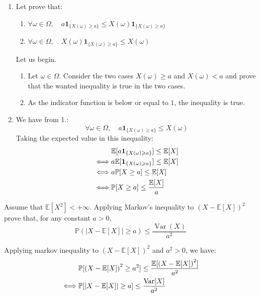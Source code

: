 \begin{solution}
  \begin{enumerate}
    \item Let prove that:
          \begin{enumerate}
            \item $\forall \omega \in \Omega, \quad a \mathbf{1}_{\{X(\omega) \geqslant a\}} \leqslant X(\omega) \mathbf{1}_{\{X(\omega) \geqslant a\}}$
            \item $\forall \omega \in \Omega, \quad X(\omega) \mathbf{1}_{\{X(\omega) \geqslant a\}} \leqslant X(\omega)$
          \end{enumerate}
          Let us begin.
          \begin{enumerate}
            \item Let $\omega \in \Omega$. Consider the two cases $X(\omega) \geq a$ and $X(\omega) < a$ and prove that the wanted inequality is true in the two cases.
            \item As the indicator function is below or equal to $1$, the inequality is true.
          \end{enumerate}
    \item We have from 1.:
          \[ \forall \omega \in \Omega, \quad a \mathbf{1}_{\{X(\omega) \geqslant a\}} \leqslant X(\omega) \]
          Taking the expected value in this inequality:
          \begin{align*}
                 & \mathbb{E}[a \mathbf{1}_{\{X(\omega) \geqslant a\}}] \leq \mathbb{E}[X] \\
            \iff & a \mathbb{E}[\mathbf{1}_{\{X(\omega) \geqslant a\}}] \leq \mathbb{E}[X] \\
            \iff & a \mathbb{P}[X \geq a] \leq \mathbb{E}[X]                                   \\
            \iff & \mathbb{P}[X \geq a] \leq \frac{\mathbb{E}[X]}{a}
          \end{align*}
  \end{enumerate}
\end{solution}

\begin{Exercise}
  Assume that $\mathbb{E}\left[X^2\right]<+\infty$. Applying Markov's inequality to ${(X-\mathbb{E}[X])}^2$ prove that, for any constant $a>0$,
  \[
    \mathbb{P}(|X-\mathbb{E}[X]| \geq a) \leq \frac{\operatorname{Var}(X)}{a^2}
  \]
\end{Exercise}

\begin{solution}
  Applying markov inequality to ${(X-\mathbb{E}[X])}^2$ and $a^2 > 0$, we have:
  \begin{align*}
         & \mathbb{P}[{(X-\mathbb{E}[X])}^2 \geq a^2] \leq \frac{\mathbb{E}[{(X-\mathbb{E}[X])}^2]}{a^2} \\
    \iff & \mathbb{P}[|X-\mathbb{E}[X]| \geq a] \leq \frac{\operatorname{Var}[X]}{a^2}
  \end{align*}
\end{solution}